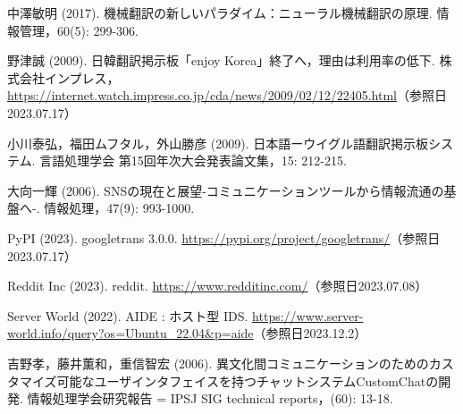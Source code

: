 \documentclass[b5paper,12pt,dvipdfmx]{jsreport}
\begin{document}
\begin{thebibliography}{99}
中澤敏明 (2017). 機械翻訳の新しいパラダイム：ニューラル機械翻訳の原理. 情報管理，60(5): 299-306.

野津誠 (2009). 日韓翻訳掲示板「enjoy Korea」終了へ，理由は利用率の低下. 株式会社インプレス，\url{https://internet.watch.impress.co.jp/cda/news/2009/02/12/22405.html}（参照日2023.07.17）

小川泰弘，福田ムフタル，外山勝彦 (2009). 日本語ーウイグル語翻訳掲示板システム. 言語処理学会 第15回年次大会発表論文集，15: 212-215.

大向一輝 (2006). SNSの現在と展望-コミュニケーションツールから情報流通の基盤へ-. 情報処理，47(9): 993-1000.


PyPI (2023). googletrans 3.0.0. \url{https://pypi.org/project/googletrans/}（参照日2023.07.17）

Reddit Inc (2023). reddit. \url{https://www.redditinc.com/}（参照日2023.07.08）

Server World (2022). AIDE : ホスト型 IDS. \url{https://www.server-world.info/query?os=Ubuntu_22.04&p=aide}（参照日2023.12.2）

吉野孝，藤井薫和，重信智宏 (2006). 異文化間コミュニケーションのためのカスタマイズ可能なユーザインタフェイスを持つチャットシステムCustomChatの開発. 情報処理学会研究報告 = IPSJ SIG technical reports，(60): 13-18.










\end{thebibliography}
\end{document}
